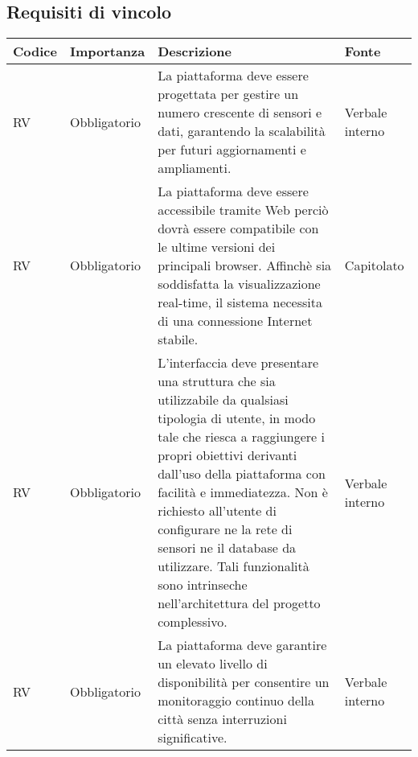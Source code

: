 \subsection{Requisiti di vincolo}
\setcounter{rowcounter}{0}
\begin{longtable}{|C{1cm}|C{2cm}|>{\raggedright}m{5cm}|C{2cm}|}
    \hline
    \textbf{Codice}                                & \textbf{Importanza} & \textbf{Descrizione}                                                                                                                                                                               & \textbf{Fonte}  \\
    \hline
    RV                          & Obbligatorio        & La piattaforma deve essere progettata per gestire un numero crescente di sensori e dati, garantendo la scalabilità per futuri aggiornamenti e ampliamenti.                                         & Verbale interno \\
    \hline
     RV & Obbligatorio        & La piattaforma deve essere accessibile tramite Web perciò dovrà essere compatibile con le ultime versioni dei principali browser. Affinchè
    sia soddisfatta la visualizzazione real-time, il sistema necessita di una
    connessione Internet stabile.                  & Capitolato                                                                                                                                                                                                                                 \\
    \hline
     RV & Obbligatorio        & L’interfaccia deve presentare una struttura che sia utilizzabile da qualsiasi tipologia di utente, in modo tale che riesca a raggiungere i propri
    obiettivi derivanti dall’uso della piattaforma con facilità e immediatezza. Non è richiesto all’utente di configurare ne la rete di sensori ne il database da utilizzare. Tali funzionalità sono intrinseche nell’architettura
    del progetto complessivo.                      & Verbale interno                                                                                                                                                                                                                            \\
    \hline
     RV & Obbligatorio        & La piattaforma deve garantire un elevato livello di disponibilità per consentire un monitoraggio continuo della città senza interruzioni significative.                                            & Verbale interno \\

\end{longtable}
